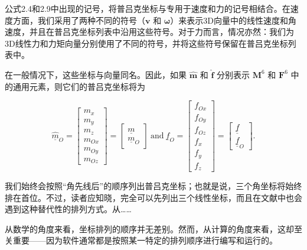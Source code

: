 \documentclass[10pt,a4paper]{book}
\theoremstyle{thmstyle} %
\theoremstyle{defstyle} %
\theoremstyle{prostyle} %
\begin{document}
公式2.4和2.9中出现的记号，将普吕克坐标与专用于速度和力的记号相结合。在速度方面，我们采用了两种不同的符号（$\boldsymbol{v}$ 和 $\boldsymbol{\omega}$）来表示3D向量中的线性速度和角速度，并且在普吕克坐标列表中沿用这些符号。对于力而言，情况亦然：我们为3D线性力和力矩向量分别使用了不同的符号，并将这些符号保留在普吕克坐标列表中。



在一般情况下，这些坐标与向量同名。因此，如果 $\hat{\boldsymbol{m}}$ 和 $\hat{\boldsymbol{f}}$ 分别表示 $\mathbf{M}^{6}$ 和 $\mathbf{F}^{6}$ 中的通用元素，则它们的普吕克坐标将为



$$
\underline { { \hat { m } } } _ { O } = \left[ \begin{array}{l} { m _ { x } } \\{ m _ { y } } \\{ m _ { z } } \\{ m _ { O x } } \\{ m _ { O y } } \\{ m _ { O z } } \end{array} \right] = \left[ \begin{array}{l} { \underline { { m } } } \\{ \underline { { m } } _ { O } } \end{array} \right]  \mathrm { ~ a n d ~ }  \underline { { \hat { f } } } _ { O } = \left[ \begin{array}{l} { f _ { O x } } \\{ f _ { O y } } \\{ f _ { O z } } \\{ f _ { x } } \\{ f _ { y } } \\{ f _ { z } } \end{array} \right] = \left[ \begin{array}{l} { \underline { { \underline { { f } } } } } \\{ \underline { { \underline { { f } } } } _ { O } } \end{array} \right] .
$$



我们始终会按照“角先线后”的顺序列出普吕克坐标；也就是说，三个角坐标将始终排在首位。不过，读者应知晓，完全可以先列出三个线性坐标，而且在文献中也会遇到这种替代性的排列方式。从……



从数学的角度来看，坐标排列的顺序并无差别。然而，从计算的角度来看，这却至关重要——因为软件通常都是按照某一特定的排列顺序进行编写和运行的。
\end{document}
